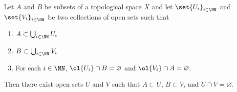 \documentclass{fkpset}
\begin{document}
\pagestyle{plain}
\pagestyle{fancy}
  \pointstable{}

  \vspace{1cm}

  \begin{problem}
    Let $A$ and $B$ be subsets of a topological space $X$ and let
    $\set{U_i}_{i \in \NN}$ and $\set{V_i}_{i \in \NN}$ be two
    collections of open sets such that
    \begin{enumerate}[label=(\arabic*)]
      \item $A \subset \bigcup_{i \in \NN} U_i$
      \item $B \subset \bigcup_{i \in \NN} V_i$
      \item For each $i \in \NN$, $\ol{U_i} \cap B = \varnothing$ and
        $\ol{V_i} \cap A = \varnothing$.
    \end{enumerate}
    Then there exist open sets $U$ and $V$ such that $A \subset U$, $B
    \subset V$, and $U \cap V = \varnothing$.
  \end{problem}
\end{document}
